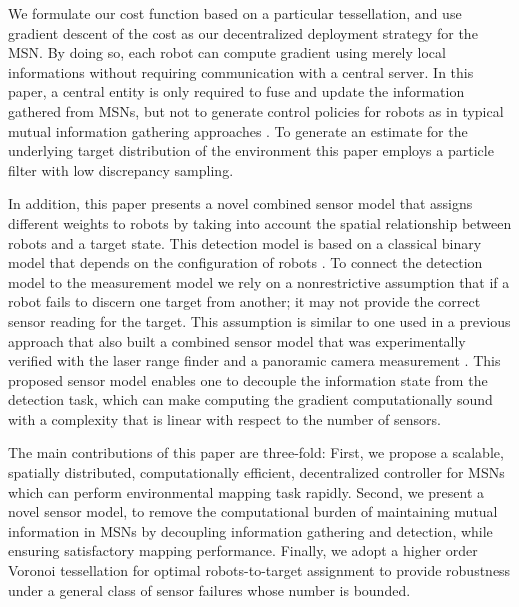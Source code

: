 \documentclass[letterpaper, 10 pt, conference]{ieeeconf}
\begin{document}
We formulate our cost function based on a particular tessellation, and use gradient descent of the cost as our decentralized deployment strategy for the MSN. 
By doing so, each robot can compute gradient using merely local informations without requiring communication with a central server.
In this paper, a central entity is only required to fuse and update the information gathered from MSNs, but not to generate control policies for robots as in typical mutual information gathering approaches \cite{schwager2017multi,julian2012distributed}. 
To generate an estimate for the underlying target distribution of the environment this paper employs a particle filter with low discrepancy sampling. 


In addition, this paper presents a novel combined sensor model that assigns different weights to robots by taking into account the spatial relationship between robots and a target state. 
This detection model is based on a classical binary model that depends on the configuration of robots \cite{viswanathan1997distributed,djuric2008target} . 
To connect the detection model to the measurement model we rely on a nonrestrictive assumption that if a robot fails to discern one target from another; it may not provide the correct sensor reading for the target. 
This assumption is similar to one used in a previous approach that also built a combined sensor model that was experimentally verified with the laser range finder and a panoramic camera measurement \cite{anguelov2004detecting}. 
This proposed sensor model enables one to decouple the information state from the detection task, which can make computing the gradient computationally sound with a complexity that is linear with respect to the number of sensors. 

The main contributions of this paper are three-fold:
First, we propose a scalable, spatially distributed, computationally efficient, decentralized controller for MSNs which can perform environmental mapping task rapidly.
Second, we present a novel sensor model, to remove the computational burden of maintaining mutual information in MSNs by decoupling information gathering and detection, while ensuring satisfactory mapping performance.
Finally, we adopt a higher order Voronoi tessellation for optimal robots-to-target assignment to provide robustness under a general class of sensor failures whose number is bounded.
\end{document}

